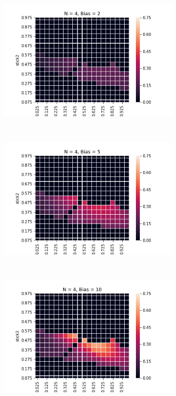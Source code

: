 \documentclass[10pt,letterpaper]{article}
\begin{document}
\begin{figure}[h]
\begin{subfigure}{0.3\linewidth}
\end{subfigure}

\begin{subfigure}{0.3\linewidth}
	\includegraphics[width=\linewidth]{figures/nSticks4bias2.png}
\end{subfigure}
~
\begin{subfigure}{0.3\linewidth}
	\includegraphics[width=\linewidth]{figures/nSticks4bias5.png}
\end{subfigure}
~
\begin{subfigure}{0.3\linewidth}
	\includegraphics[width=\linewidth]{figures/nSticks4bias10.png}
\end{subfigure}


\end{figure}
\end{document}
